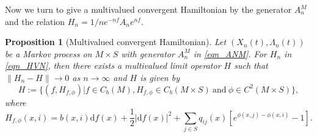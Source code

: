 \documentclass[a4paper]{article}
\numberwithin{equation}{section}
\newtheorem{proposition}[theorem]{Proposition}
\theoremstyle{definition}
\begin{document}
Now we turn to give a multivalued convergent Hamiltonian by the generator $A^M_n$ and the relation $H_n=1/ne^{-nf}A_ne^{nf}$.
\begin{proposition}
    [Multivalued convergent Hamiltonian]\label{pro_convergence_of_operator}
	 Let $(X_n(t),\Lambda_n(t))$ be a Markov process on $M\times S$ with generator $A^M_n$ in \eqref{eqn_ANM}. For $H_n$ in \eqref{eqn_HVN}, then there exists a multivalued limit operator $H$ such that $\|H_n-H\|\to0$ as $n\to \infty$ and $H$ is given by
		\begin{equation}\label{eqn_multivale_H}
		H:=\Big\{(f,H_{f,\phi})\Big|f\in C_b(M), H_{f,\phi}\in C_b(M\times S)~\mbox{and}~\phi\in C^2(M\times S)\Big\},
	\end{equation}
 where 
 \begin{equation}\label{eqn_HFPHi}
     H_{f,\phi}(x,i)=b(x,i)\mathrm{d} f(x)+\frac{1}{2}|\mathrm{d}f(x)|^2+\sum_{j\in S}q_{ij}(x)[e^{\phi(x,j)-\phi(x,i)}-1].
 \end{equation}
\end{proposition}
\end{document}
